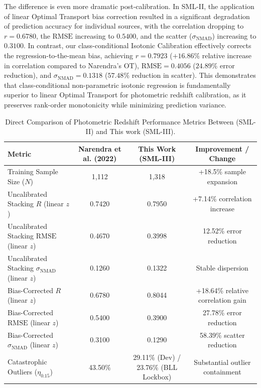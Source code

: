 \documentclass[twocolumn,linenumbers,floatfix]{aastex701}
\begin{document}
The difference is even more dramatic post-calibration. In SML-II, the application of linear Optimal Transport bias correction resulted in a significant degradation of prediction accuracy for individual sources, with the correlation dropping to $r = 0.6780$, the $\text{RMSE}$ increasing to $0.5400$, and the scatter ($\sigma_{\text{NMAD}}$) increasing to $0.3100$. In contrast, our class-conditional Isotonic Calibration effectively corrects the regression-to-the-mean bias, achieving $r = 0.7923$ ($+16.86\%$ relative increase in correlation compared to Narendra's OT), $\text{RMSE} = 0.4056$ ($24.89\%$ error reduction), and $\sigma_{\text{NMAD}} = 0.1318$ ($57.48\%$ reduction in scatter). This demonstrates that class-conditional non-parametric isotonic regression is fundamentally superior to linear Optimal Transport for photometric redshift calibration, as it preserves rank-order monotonicity while minimizing prediction variance.

\begin{table}[t!]
\centering
\caption{Direct Comparison of Photometric Redshift Performance Metrics Between \citealt{Narendra2022} (SML-II) and This work (SML-III).}
\label{tab:sml2_sml3_comparison}
\renewcommand{\arraystretch}{1.15}
\setlength{\tabcolsep}{6pt}
\footnotesize
\begin{tabular}{lccc}
\hline\hline
Metric & Narendra et al. (2022) & This Work (SML-III) & Improvement / Change \\
\hline
    Training Sample Size ($N$) & 1,112 & 1,318 & +18.5\% sample expansion \\
    Uncalibrated Stacking $R$ (linear $z$) & 0.7420 & 0.7950 & +7.14\% correlation increase \\
    Uncalibrated Stacking $\mathrm{RMSE}$ (linear $z$) & 0.4670 & 0.3998 & 12.52\% error reduction \\
    Uncalibrated Stacking $\sigma_{\mathrm{NMAD}}$ (linear $z$) & 0.1260 & 0.1322 & Stable dispersion \\
    \hline
    Bias-Corrected $R$ (linear $z$) & 0.6780 & 0.8044 & +18.64\% relative correlation gain \\
    Bias-Corrected $\mathrm{RMSE}$ (linear $z$) & 0.5400 & 0.3900 & 27.78\% error reduction \\
    Bias-Corrected $\sigma_{\mathrm{NMAD}}$ (linear $z$) & 0.3100 & 0.1290 & 58.39\% scatter reduction \\
    Catastrophic Outliers ($\eta_{0.15}$) & 43.50\% & 29.11\% (Dev) / 23.76\% (BLL Lockbox) & Substantial outlier containment \\
    \hline
\end{tabular}
\end{table}
\end{document}
